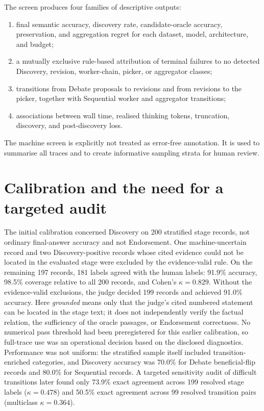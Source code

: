 The screen produces four families of descriptive outputs:

\begin{enumerate}[leftmargin=*]
  \item final semantic accuracy, discovery rate, candidate-oracle accuracy, preservation, and aggregation regret for each dataset, model, architecture, and budget;
  \item a mutually exclusive rule-based attribution of terminal failures to no detected Discovery, revision, worker-chain, picker, or aggregator classes;
  \item transitions from Debate proposals to revisions and from revisions to the picker, together with Sequential worker and aggregator transitions;
  \item associations between wall time, realised thinking tokens, truncation, discovery, and post-discovery loss.
\end{enumerate}

The machine screen is explicitly not treated as error-free annotation. It is used to summarise all traces and to create informative sampling strata for human review.

\section{Calibration and the need for a targeted audit}
\label{sec:calibration}

The initial calibration concerned Discovery on 200 stratified stage records, not ordinary final-answer accuracy and not Endorsement. One machine-uncertain record and two Discovery-positive records whose cited evidence could not be located in the evaluated stage were excluded by the evidence-valid rule. On the remaining 197 records, 181 labels agreed with the human labels: 91.9\% accuracy, 98.5\% coverage relative to all 200 records, and Cohen's $\kappa=0.829$. Without the evidence-valid exclusions, the judge decided 199 records and achieved 91.0\% accuracy. Here \emph{grounded} means only that the judge's cited numbered statement can be located in the stage text; it does not independently verify the factual relation, the sufficiency of the oracle passages, or Endorsement correctness. No numerical pass threshold had been preregistered for this earlier calibration, so full-trace use was an operational decision based on the disclosed diagnostics. Performance was not uniform: the stratified sample itself included transition-enriched categories, and Discovery accuracy was 70.0\% for Debate beneficial-flip records and 80.0\% for Sequential \ctow{} records. A targeted sensitivity audit of difficult transitions later found only 73.9\% exact agreement across 199 resolved stage labels ($\kappa=0.478$) and 50.5\% exact agreement across 99 resolved transition pairs (multiclass $\kappa=0.364$).

